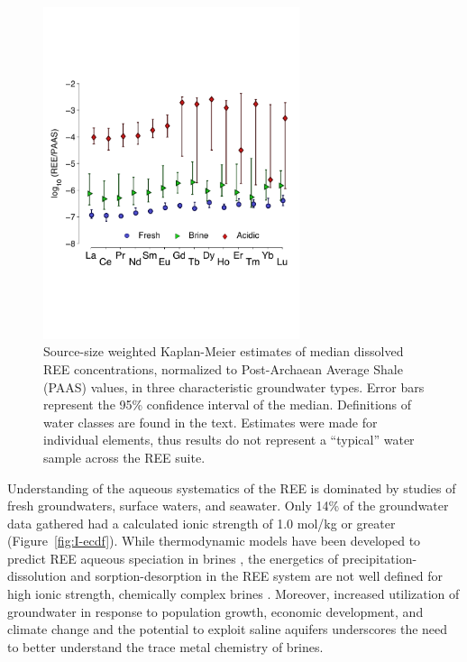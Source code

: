 \begin{figure}[htbp]
\begin{center}
\includegraphics[width=0.67\textwidth]{Ch3_figures/REE-GW-KMmed.pdf}
\caption{Source-size weighted Kaplan-Meier estimates of median dissolved REE concentrations, normalized to Post-Archaean Average Shale (PAAS) values, in three characteristic groundwater types.
Error bars represent the 95\% confidence interval of the median.
Definitions of water classes are found in the text.
Estimates were made for individual elements, thus results do not represent a ``typical'' water sample across the REE suite.}\label{fig:GW-type-med}
\end{center}
\end{figure}

Understanding of the aqueous systematics of the REE is dominated by studies of fresh groundwaters, surface waters, and seawater.
Only 14\% of the groundwater data gathered had a calculated ionic strength of 1.0 mol/kg or greater (Figure~\ref{fig:I-ecdf}).
While thermodynamic models have been developed to predict REE aqueous speciation in brines \citep{Millero_GCA_1992},
the energetics of precipitation-dissolution and sorption-desorption in the REE system are not well defined for high ionic strength, chemically complex brines \citep{Quinn_MC_2006}.
Moreover, increased utilization of groundwater \citep{Chen_WRM_2013} in response to population growth, economic development, and climate change and the potential to exploit saline aquifers \citep{Benko_EES_2008} underscores the need to better understand the trace metal chemistry of brines.


